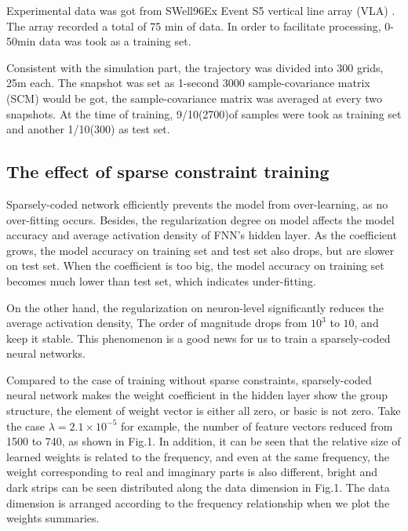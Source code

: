 Experimental data was got from SWell96Ex Event S5 vertical line array (VLA) . The array recorded a total of 75 min of data. In order to facilitate processing, 0\--50min data was took as a training set.

Consistent with the simulation part, the trajectory was divided into 300 grids, 25m each. The snapshot was set as 1-second 3000 sample-covariance matrix (SCM) would be got, the sample-covariance matrix was averaged at every two snapshots.
At the time of training, 9/10(2700)of samples were took as training set and another 1/10(300) as test set.

\subsection{The effect of sparse constraint training}
Sparsely-coded network efficiently prevents the model from over-learning, as no over-fitting occurs.
Besides, the regularization degree on model affects the model accuracy and average activation density of FNN's hidden layer. As the coefficient grows, the model accuracy on training set and test set also drops, but are slower on test set. When the coefficient is too big, the model accuracy on training set becomes much lower than test set, which indicates under-fitting.

On the other hand, the regularization on neuron-level significantly reduces the average activation density,
The order of magnitude drops from $10^{3}$ to $10$, and keep it stable. This phenomenon is a good news for us to train a sparsely-coded neural networks.

Compared to the case of training without sparse constraints, sparsely-coded neural network makes the weight coefficient in the hidden layer show the group structure, the element of weight vector is either all zero, or basic is not zero. Take the case $\lambda=2.1 \times 10^{-5} $
for example, the number of feature vectors reduced from 1500 to 740, as shown in Fig.1. In addition, it can be seen that the relative size of learned weights is related to the frequency, and even at the same frequency, the weight corresponding
to real and imaginary parts is also different, bright and dark strips can be seen distributed along the data dimension in Fig.1. The data dimension is arranged according to the frequency relationship when we plot the weights summaries.

